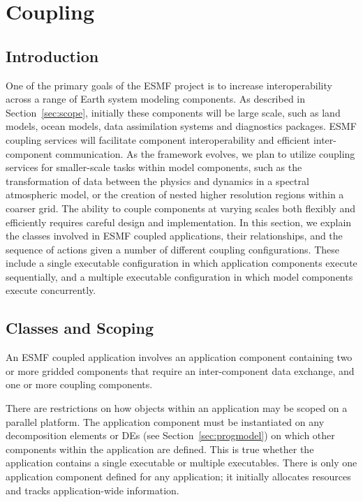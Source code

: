 \section{Coupling}

\subsection{Introduction}

One of the primary goals of the ESMF project is to increase interoperability
across a range of Earth system modeling components.  As described in 
Section~\ref{sec:scope}, initially these 
components will be large scale, such as land models, ocean models, 
data assimilation systems and diagnostics packages.  ESMF coupling 
services will facilitate component 
interoperability and efficient inter-component communication.  As the 
framework evolves, we plan to utilize coupling services for smaller-scale 
tasks within model components, such as the transformation of data between the 
physics and dynamics in a spectral atmospheric model, or the creation 
of nested higher resolution regions within a coarser grid.  The ability to 
couple components at varying scales both flexibly and efficiently requires
careful design and implementation.  In this section, we 
explain the classes involved in ESMF coupled applications, their 
relationships, and the sequence of actions given a number of different 
coupling configurations.  These include a single executable configuration in 
which application components execute sequentially, and a multiple executable
configuration in which model components execute concurrently.

\subsection{Classes and Scoping}

An ESMF coupled application involves an application component 
containing two or more gridded components that require an 
inter-component data exchange, and one or more coupling 
components.

There are restrictions on how objects within an application may be scoped
on a parallel platform.  The application component must be instantiated on 
any decomposition elements or DEs (see Section~\ref{sec:progmodel}) on 
which other components
within the application are defined.  This is true whether the 
application contains a single executable or multiple 
executables.  There is only one application component defined for any
application; it initially allocates resources and tracks application-wide 
information.  

